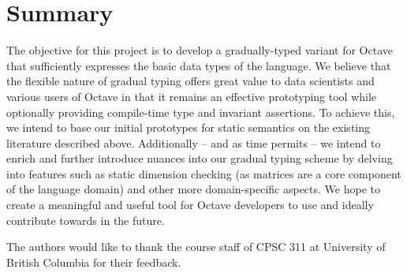 \section{Summary}
The objective for this project is to develop a gradually-typed variant for
Octave that sufficiently expresses the basic data types of the language. We
believe that the flexible nature of gradual typing offers great value to data
scientists and various users of Octave in that it remains an effective
prototyping tool while optionally providing compile-time type and invariant
assertions. To achieve this, we intend to base our initial prototypes for static
semantics on the existing literature described above. Additionally -- and as
time permits -- we intend to enrich and further introduce nuances into our
gradual typing scheme by delving into features such as static dimension checking
(as matrices are a core component of the language domain) and other more
domain-specific aspects. We hope to create a meaningful and useful tool for
Octave developers to use and ideally contribute towards in the future.

\appendix

\begin{acks}
    The authors would like to thank the course staff of CPSC 311 at University
    of British Columbia for their feedback.
\end{acks}
